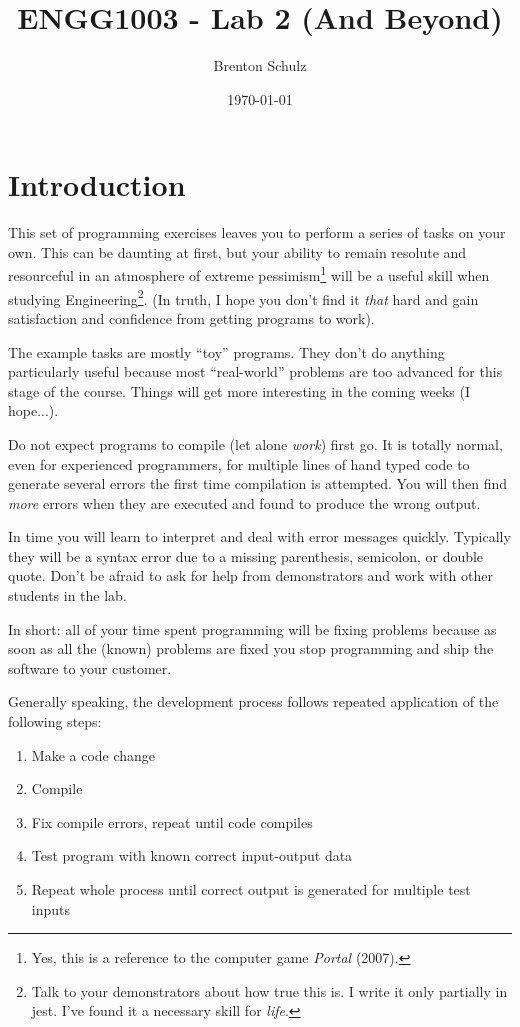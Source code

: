 \documentclass{lab}
\title{ENGG1003 - Lab 2 (And Beyond)}
\author{Brenton Schulz}
\date{\today}
\begin{document}
\maketitle

\section{Introduction}

This set of programming exercises leaves you to perform a series of tasks on your own. This can be daunting at first, but your ability to remain resolute and resourceful in an atmosphere of extreme pessimism\footnote{Yes, this is a reference to the computer game \textit{Portal} (2007).} will be a useful skill when studying Engineering\footnote{Talk to your demonstrators about how true this is. I write it only partially in jest. I've found it a necessary skill for \textit{life}.}. (In truth, I hope you don't find it \textit{that} hard and gain satisfaction and confidence from getting programs to work).

The example tasks are mostly ``toy'' programs. They don't do anything particularly useful because most ``real-world'' problems are too advanced for this stage of the course. Things will get more interesting in the coming weeks (I hope...).

Do not expect programs to compile (let alone \textit{work}) first go. It is totally normal, even for experienced programmers, for multiple lines of hand typed code to generate several errors the first time compilation is attempted. You will then find \textit{more} errors when they are executed and found to produce the wrong output.

In time you will learn to interpret and deal with error messages quickly. Typically they will be a syntax error due to a missing parenthesis, semicolon, or double quote. Don't be afraid to ask for help from demonstrators and work with other students in the lab.

In short: all of your time spent programming will be fixing problems because as soon as all the (known) problems are fixed you stop programming and ship the software to your customer.

Generally speaking, the development process follows repeated application of the following steps:

\begin{enumerate}
\item Make a code change
\item Compile
\item Fix compile errors, repeat until code compiles
\item Test program with known correct input-output data
\item Repeat whole process until correct output is generated for multiple test inputs
\end{enumerate}
\end{document}
